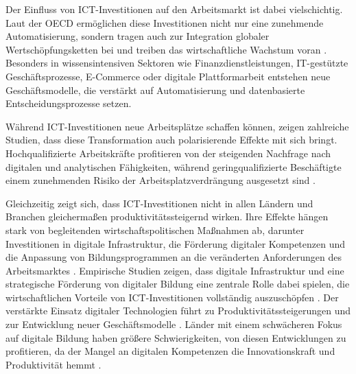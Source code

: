 Der Einfluss von \ac{ICT}-Investitionen auf den Arbeitsmarkt ist dabei vielschichtig. Laut der 
\ac{OECD} ermöglichen diese Investitionen nicht nur eine zunehmende Automatisierung, sondern 
tragen auch zur Integration globaler Wertschöpfungsketten bei und treiben das wirtschaftliche 
Wachstum voran \parencite[vgl.][S. 228–229]{oecd2019measuring}. Besonders in wissensintensiven 
Sektoren wie Finanzdienstleistungen, \ac{IT}-gestützte Geschäftsprozesse, E-Commerce oder 
digitale Plattformarbeit entstehen neue Geschäftsmodelle, die verstärkt auf Automatisierung und 
datenbasierte Entscheidungsprozesse setzen.

Während \ac{ICT}-Investitionen neue Arbeitsplätze schaffen können, zeigen zahlreiche 
Studien, dass diese Transformation auch polarisierende Effekte mit sich bringt. 
Hochqualifizierte Arbeitskräfte profitieren von der steigenden Nachfrage nach digitalen 
und analytischen Fähigkeiten, während geringqualifizierte Beschäftigte einem zunehmenden 
Risiko der Arbeitsplatzverdrängung ausgesetzt sind 
\parencite[vgl.][S. 48–52]{brynjolfsson2014thesecond}.

Gleichzeitig zeigt sich, dass \ac{ICT}-Investitionen nicht in allen Ländern und Branchen 
gleichermaßen produktivitätssteigernd wirken. Ihre Effekte hängen stark von begleitenden 
wirtschaftspolitischen Maßnahmen ab, darunter Investitionen in digitale Infrastruktur, 
die Förderung digitaler Kompetenzen und die Anpassung von Bildungsprogrammen an die 
veränderten Anforderungen des Arbeitsmarktes 
\parencite[vgl.][S. 230–234]{brynjolfsson2014thesecond}. Empirische Studien zeigen, dass digitale 
Infrastruktur und eine strategische Förderung von digitaler Bildung eine zentrale Rolle dabei 
spielen, die wirtschaftlichen Vorteile von \ac{ICT}-Investitionen vollständig auszuschöpfen 
\parencite[vgl.][S. 357–358]{vu2011ict}. Der verstärkte Einsatz digitaler Technologien führt zu 
Produktivitätssteigerungen und zur Entwicklung neuer Geschäftsmodelle 
\parencite[vgl.][S. 361–362]{vu2011ict}. 
Länder mit einem schwächeren Fokus auf digitale Bildung haben größere Schwierigkeiten, von diesen 
Entwicklungen zu profitieren, da der Mangel an digitalen Kompetenzen die Innovationskraft und 
Produktivität hemmt \parencite[vgl.][S. 122–124]{oecd2020digital}.

